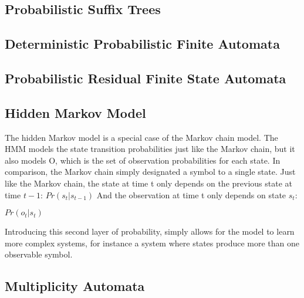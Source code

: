 \subsection{Probabilistic Suffix Trees}
\subsection{Deterministic Probabilistic Finite Automata}
\subsection{Probabilistic Residual Finite State Automata}

%


\subsection{Hidden Markov Model}
The hidden Markov model is a special case of the Markov chain model. The HMM models the state transition probabilities just like the Markov chain, but it also models O, which is the set of observation probabilities for each state. In comparison, the Markov chain simply designated a symbol to a single state.
Just like the Markov chain, the state at time t only depends on the previous state at time $t-1$: $Pr(s_t | s_{t-1})$
And the observation at time t only depends on state $s_t$:
\begin{description}
\item $Pr(o_t | s_t)$
\end{description}


Introducing this second layer of probability, simply allows for the model to learn more complex systems, for instance a system where states produce more than one observable symbol. \cite{poole2010artificial}

\subsection{Multiplicity Automata}


